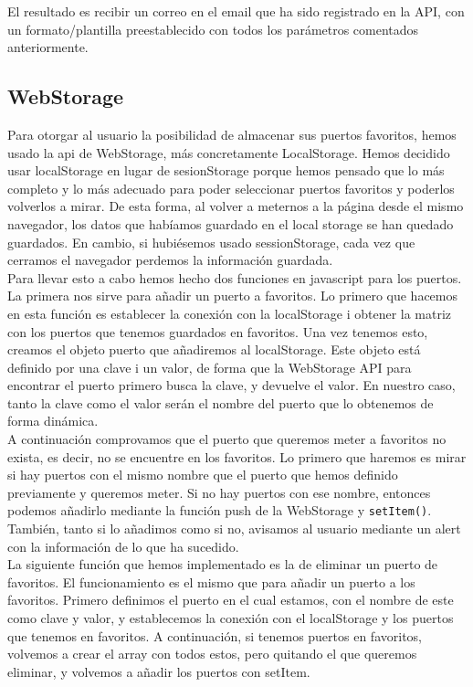 \documentclass{article}
\begin{document}
    El resultado es recibir un correo en el email que ha sido registrado en la API, con un formato/plantilla preestablecido con todos los parámetros comentados anteriormente.

\subsection{WebStorage}
Para otorgar al usuario la posibilidad de almacenar sus puertos favoritos, hemos usado la api de WebStorage, más concretamente LocalStorage. Hemos decidido usar localStorage en lugar de sesionStorage porque hemos pensado que lo más completo y lo más adecuado para poder seleccionar puertos favoritos y poderlos volverlos a mirar. De esta forma, al volver a meternos a la página desde el mismo navegador, los datos que habíamos guardado en el local storage se han quedado guardados. En cambio, si hubiésemos usado sessionStorage, cada vez que cerramos el navegador perdemos la información guardada.\\

\noindent Para llevar esto a cabo hemos hecho dos funciones en javascript para los puertos. La primera nos sirve para añadir un puerto a favoritos. Lo primero que hacemos en esta función es establecer la conexión con la localStorage i obtener la matriz con los puertos que tenemos guardados en favoritos. Una vez tenemos esto, creamos el objeto puerto que añadiremos al localStorage. Este objeto está definido por una clave i un valor, de forma que la WebStorage API para encontrar el puerto primero busca la clave, y devuelve el valor. En nuestro caso, tanto la clave como el valor serán el nombre del puerto que lo obtenemos de forma dinámica.\\ 

\noindent A continuación comprovamos que el puerto que queremos meter a favoritos no exista, es decir, no se encuentre en los favoritos. Lo primero que haremos es mirar si hay puertos con el mismo nombre que el puerto que hemos definido previamente y queremos meter. Si no hay puertos con ese nombre, entonces podemos añadirlo mediante la función push de la WebStorage y \texttt{setItem()}. También, tanto si lo añadimos como si no, avisamos al usuario mediante un alert con la información de lo que ha sucedido.\\

\noindent La siguiente función que hemos implementado es la de eliminar un puerto de favoritos. El funcionamiento es el mismo que para añadir un puerto a los favoritos. Primero definimos el puerto en el cual estamos, con el nombre de este como clave y valor, y establecemos la conexión con el localStorage y los puertos que tenemos en favoritos. A continuación, si tenemos puertos en favoritos, volvemos a crear el array con todos estos, pero quitando el que queremos eliminar, y volvemos a añadir los puertos con setItem.\\
\end{document}
